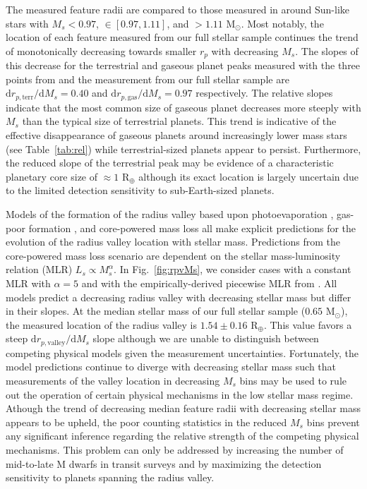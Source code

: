 \documentclass[twocolumn]{emulateapj}
\begin{document}
The measured feature radii are compared to those measured in \cite{fulton18} around Sun-like stars with
$M_s <0.97$, $\in [0.97,1.11]$, and $>1.11$ M$_{\odot}$.
Most notably, the location of each feature measured from our full stellar sample continues the trend of monotonically
decreasing towards smaller $r_p$ with decreasing $M_s$. The slopes of this decrease for the terrestrial and gaseous
planet peaks measured with the three points from \cite{fulton18} and the measurement from our full stellar sample
are $\text{d}r_{p,\text{terr}} / \text{d}M_s = 0.40$ and $\text{d}r_{p,\text{gas}} / \text{d}M_s = 0.97$
respectively. The relative slopes indicate that the most common size of
gaseous planet decreases more steeply with $M_s$ than the typical size of terrestrial planets. This trend
is indicative of the effective disappearance of gaseous planets around increasingly lower mass stars
(see Table~\ref{tab:rel}) while terrestrial-sized planets appear to persist.
Furthermore, the reduced slope of the terrestrial peak may be evidence of
a characteristic planetary core size of $\approx 1$ R$_{\oplus}$ although its exact location is largely uncertain
due to the limited detection sensitivity to sub-Earth-sized planets.   

Models of the formation of the radius valley based upon photoevaporation \citep{wu19}, gas-poor formation \citep{lopez18},
and core-powered mass loss \citep{gupta19b} all make explicit predictions for the evolution of the radius valley location
with stellar mass. Predictions from the core-powered mass loss scenario are dependent on the stellar mass-luminosity
relation (MLR) $L_s \propto M_s^{\alpha}$. In Fig.~\ref{fig:rpvMs}, we consider cases with a constant MLR with $\alpha=5$
\citep{gupta19b} and with the empirically-derived piecewise MLR from \cite{eker18}. All models predict a decreasing
radius valley with decreasing stellar mass but differ in their slopes. 
At the median stellar mass of our full stellar sample ($0.65$ M$_{\odot}$), the measured location of the radius valley is
$1.54\pm 0.16$ R$_{\oplus}$. This value favors a steep $\text{d}r_{p,\text{valley}} / \text{d}M_s$ slope although we are
unable to distinguish between competing physical models given the measurement uncertainties.
Fortunately, the model predictions continue to diverge
with decreasing stellar mass such that measurements of the valley location in decreasing $M_s$ bins may be used to
rule out the operation of certain physical mechanisms in the low stellar mass regime. Athough the trend of decreasing
median feature radii with decreasing stellar mass appears to be upheld, the poor counting statistics in the reduced
$M_s$ bins prevent any significant inference regarding the relative strength of the competing physical mechanisms.
This problem can only be addressed by increasing the number of mid-to-late M dwarfs in transit surveys and by maximizing
the detection sensitivity to planets spanning the radius valley.
\end{document}
